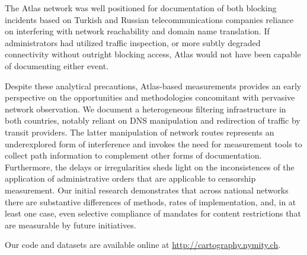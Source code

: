 The Atlas network was well positioned for documentation of both blocking incidents based on Turkish and Russian telecommunications companies reliance on interfering with network reachability and domain name translation. If administrators had utilized traffic inspection, or more subtly degraded connectivity without outright blocking access, Atlas would not have been capable of documenting either event.

Despite these analytical precautions, Atlas-based measurements provides an early perspective on the opportunities and methodologies concomitant with pervasive network observation. We document a heterogeneous filtering infrastructure in both countries, notably reliant on DNS manipulation and redirection of traffic by transit providers. The latter manipulation of network routes represents an underexplored form of interference and invokes the need for measurement tools to collect path information to complement other forms of documentation. Furthermore, the delays or irregularities sheds light on the inconsistences of the application of administrative orders that are applicable to censorship measurement. Our initial research demonstrates that across national networks there are substantive differences of methods, rates of implementation, and, in at least one case, even selective compliance of mandates for content restrictions that are measurable by future initiatives.

Our code and datasets are available online at \url{http://cartography.nymity.ch}.

